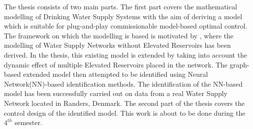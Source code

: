 The thesis consists of two main parts. The first part covers the mathematical modelling of Drinking Water Supply Systems with the aim of deriving a model which is suitable for plug-and-play commissionable model-based optimal control. The framework on which the modelling is based is motivated by \cite{oneinput_paper}, where the modelling of Water Supply Networks without Elevated Reservoirs has been derived. In the thesis, this existing model is extended by taking into account the dynamic effect of multiple Elevated Reservoirs placed in the network. The graph-based extended model then attempted to be identified using Neural Network(NN)-based identification methods. The identification of the NN-based model has been successfully carried out on data from a real Water Supply Network located in Randers, Denmark. 
\newline
The second part of the thesis covers the control design of the identified model. This work is about to be done during the $4^{th}$ semester. 
